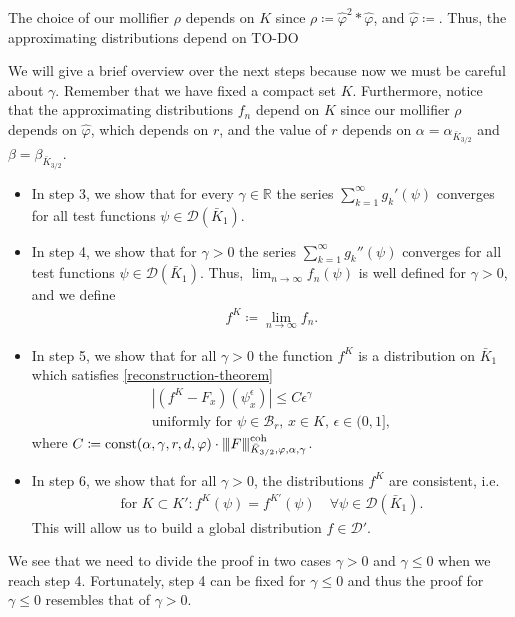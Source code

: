 \begin{remark}\label{remark:fk-depends}
    The choice of our mollifier $\rho$ depends on $K$ since $\rho \coloneqq \hat \varphi^2 * \hat \varphi$, and $\hat \varphi \coloneqq $. Thus, the approximating distributions depend on TO-DO
\end{remark}

We will give a brief overview over the next steps because now we must be careful about $\gamma$. Remember that we have fixed a compact set $K$. Furthermore, notice that the approximating distributions $f_n$ depend on $K$ since our mollifier $\rho$ depends on $\hat \varphi$, which depends on $r$, and the value of $r$ depends on $\alpha = \alpha_{\bar K_{3/2}}$ and $\beta = \beta_{\bar K_{3/2}}$.
\begin{itemize}
    \item In step 3, we show that for every $\gamma \in \mathbb{R}$ the series $\sum^{\infty}_{k=1} g_k'(\psi)$ converges for all test functions $\psi \in \mathcal{D}(\bar K_1)$.
    \item In step 4, we show that for $\gamma > 0$ the series $\sum^{\infty}_{k=1} g_k''(\psi)$ converges for all test functions $\psi \in \mathcal{D}(\bar K_1)$. Thus, $\lim_{n \to \infty} f_n(\psi)$ is well defined for $\gamma > 0$, and we define 
    \begin{align*}
        f^K \coloneqq \lim_{n \to \infty}f_n.
    \end{align*}
    \item In step 5, we show that for all $\gamma > 0$ the function $f^K$ is a distribution on $\bar K_1$ which satisfies \eqref{reconstruction-theorem}
    \begin{gather*}
        |(f^K - F_x)(\psi^\epsilon_x)| \leq C \epsilon^\gamma \\ 
        \text{uniformly for $\psi \in \mathcal{B}_r$, $x \in K$, $\epsilon \in (0,1]$},
    \end{gather*}
    where $C \coloneqq \mathrm{const}(\alpha, \gamma, r, d, \varphi) \cdot {\left\vert\kern-0.25ex\left\vert\kern-0.25ex\left\vert F \right\vert\kern-0.25ex\right\vert\kern-0.25ex\right\vert}^{\mathrm{coh}}_{\bar K_{3/2}, \varphi, \alpha, \gamma}$.
    \item In step 6, we show that for all $\gamma > 0$, the distributions $f^K$ are consistent, i.e.
    \begin{align*}
        \text{for } K \subset K': f^{K}(\psi) = f^{K'}(\psi) \quad \forall \psi \in \mathcal{D}(\bar K_1).
    \end{align*}
    This will allow us to build a global distribution $f \in \mathcal{D}'$.
\end{itemize}
We see that we need to divide the proof in two cases $\gamma > 0$ and $\gamma \leq 0$ when we reach step 4. Fortunately, step 4 can be fixed for $\gamma \leq 0$ and thus the proof for $\gamma \leq 0$ resembles that of $\gamma > 0$.


